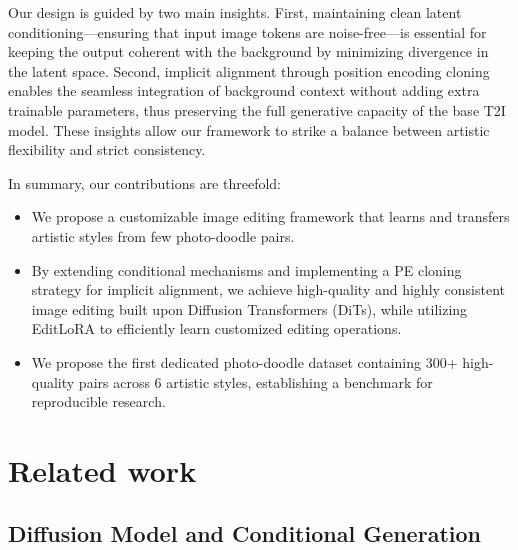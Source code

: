 Our design is guided by two main insights. First, maintaining clean latent conditioning—ensuring that input image tokens are noise-free—is essential for keeping the output coherent with the background by minimizing divergence in the latent space. Second, implicit alignment through position encoding cloning enables the seamless integration of background context without adding extra trainable parameters, thus preserving the full generative capacity of the base T2I model. These insights allow our framework to strike a balance between artistic flexibility and strict consistency.


In summary, our contributions are threefold:
\begin{itemize}
    \item We propose a customizable image editing framework that learns and transfers artistic styles from few photo-doodle pairs.
    \item By extending conditional mechanisms and implementing a PE cloning strategy for implicit alignment, we achieve high-quality and highly consistent image editing built upon Diffusion Transformers (DiTs), while utilizing EditLoRA to efficiently learn customized editing operations.
    \item We propose the first dedicated photo-doodle dataset containing 300+ high-quality pairs across 6 artistic styles, establishing a benchmark for reproducible research.
\end{itemize}


\section{Related work}
\subsection{Diffusion Model and Conditional Generation}


